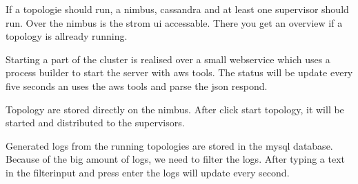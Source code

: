 If a topologie should run, a nimbus, cassandra and at least one supervisor should run. Over the nimbus is the strom ui accessable. There you get an overview if a topology is allready running.

Starting a part of the cluster is realised over a small webservice which uses a process builder to start the server with aws tools. The status will be update every five seconds an uses the aws tools and parse the json respond.

Topology are stored directly on the nimbus. After click start topology, it will be started and distributed to the supervisors.

Generated logs from the running topologies are stored in the mysql database. Because of the big amount of logs, we need to filter the logs. After typing a text in the filterinput and press enter the logs will update every second.
